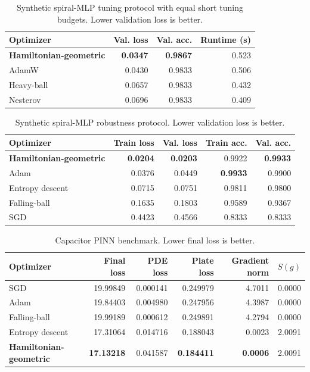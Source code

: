 \documentclass[10pt,twocolumn]{article}
\begin{document}
\begin{table}[t]
\centering
\caption{Synthetic spiral-MLP tuning protocol with equal short tuning budgets.
Lower validation loss is better.}
\label{tab:algoperf-local}
\begin{tabular}{@{}lrrr@{}}
\toprule
Optimizer & Val. loss & Val. acc. & Runtime (s) \\
\midrule
\textbf{Hamiltonian-geometric} & \textbf{0.0347} & \textbf{0.9867} & 0.523 \\
AdamW & 0.0430 & 0.9833 & 0.506 \\
Heavy-ball & 0.0657 & 0.9833 & 0.432 \\
Nesterov & 0.0696 & 0.9833 & 0.409 \\
\bottomrule
\end{tabular}
\end{table}

\begin{table}[t]
\centering
\caption{Synthetic spiral-MLP robustness protocol. Lower validation loss is
better.}
\label{tab:deepobs-local}
\begin{tabular}{@{}lrrrr@{}}
\toprule
Optimizer & Train loss & Val. loss & Train acc. & Val. acc. \\
\midrule
\textbf{Hamiltonian-geometric} & \textbf{0.0204} & \textbf{0.0203} & 0.9922 & \textbf{0.9933} \\
Adam & 0.0376 & 0.0449 & \textbf{0.9933} & 0.9900 \\
Entropy descent & 0.0715 & 0.0751 & 0.9811 & 0.9800 \\
Falling-ball & 0.1635 & 0.1803 & 0.9589 & 0.9367 \\
SGD & 0.4423 & 0.4566 & 0.8333 & 0.8333 \\
\bottomrule
\end{tabular}
\end{table}

\begin{table}[t]
\centering
\caption{Capacitor PINN benchmark. Lower final loss is better.}
\label{tab:pinn}
\begin{tabular}{@{}lrrrrr@{}}
\toprule
Optimizer & Final loss & PDE loss & Plate loss & Gradient norm & $S(g)$ \\
\midrule
SGD & 19.99849 & 0.000141 & 0.249979 & 4.7011 & 0.0000 \\
Adam & 19.84403 & 0.004980 & 0.247956 & 4.3987 & 0.0000 \\
Falling-ball & 19.99189 & 0.000612 & 0.249891 & 4.2794 & 0.0000 \\
Entropy descent & 17.31064 & 0.014716 & 0.188043 & 0.0023 & 2.0091 \\
\textbf{Hamiltonian-geometric} & \textbf{17.13218} & 0.041587 & \textbf{0.184411} & \textbf{0.0006} & 2.0091 \\
\bottomrule
\end{tabular}
\end{table}
\end{document}
